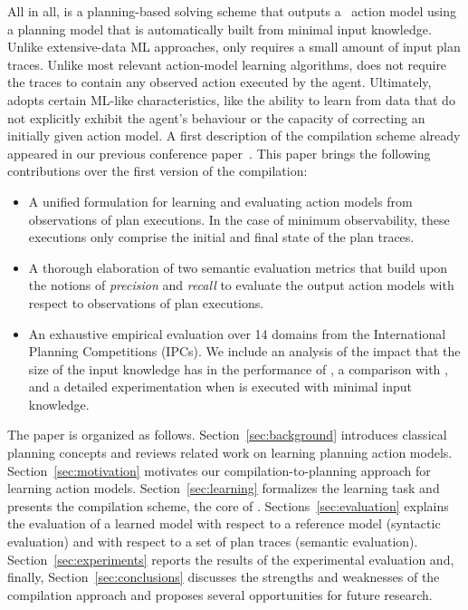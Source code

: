 All in all, \FAMA is a planning-based solving scheme that outputs a \strips\ action model using a planning model that is automatically built from minimal input knowledge. Unlike extensive-data ML approaches, \FAMA only requires a small amount of input plan traces. Unlike most relevant action-model learning algorithms, \FAMA does not require the traces to contain any observed action executed by the agent. Ultimately, \FAMA adopts certain ML-like characteristics, like the ability to learn from data that do not explicitly exhibit the agent's behaviour or the capacity of correcting an initially given action model. A first description of the \FAMA compilation scheme already appeared in our previous conference paper~\cite{aineto2018learning}. This paper brings the following contributions over the first version of the compilation:

\begin{itemize}
\item A unified formulation for learning and evaluating action models from observations of plan executions. In the case of minimum observability, these executions only comprise the initial and final state of the plan traces.
\item A thorough elaboration of two semantic evaluation metrics that build upon the notions of {\em precision} and {\em recall} to evaluate the output action models with respect to observations of plan executions.
\item An exhaustive empirical evaluation over 14 domains from the International Planning Competitions (IPCs). We include an analysis of the impact that the size of the input knowledge has in the performance of \FAMA, a comparison with \ARMS, and a detailed experimentation when \FAMA is executed with minimal input knowledge.
\end{itemize}






The paper is organized as follows. Section~\ref{sec:background} introduces classical planning concepts and reviews related work on learning planning action models. Section~\ref{sec:motivation} motivates our compilation-to-planning approach for learning action models. Section~\ref{sec:learning} formalizes the learning task and presents the compilation scheme, the core of \FAMA. Sections~\ref{sec:evaluation} explains the evaluation of a learned model with respect to a reference model (syntactic evaluation) and with respect to a set of plan traces (semantic evaluation). Section~\ref{sec:experiments} reports the results of the experimental evaluation and, finally, Section~\ref{sec:conclusions} discusses the strengths and weaknesses of the compilation approach and proposes several opportunities for future research.








